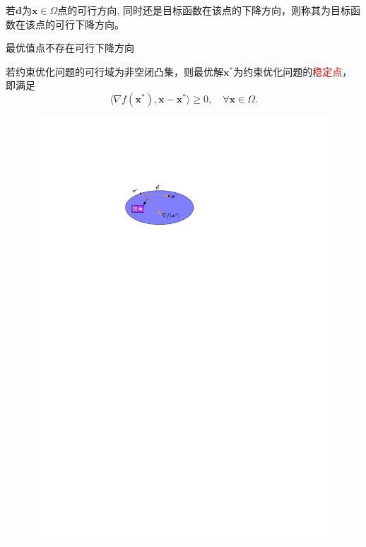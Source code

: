 \begin{theorem}[可行下降方向]
    若$\boldsymbol{d}$为$\boldsymbol{x}\in\Omega$点的可行方向, 同时还是目标函数在该点的下降方向，则称其为目标函数在该点的可行下降方向。

    最优值点不存在可行下降方向
\end{theorem}
\begin{theorem}
    若约束优化问题的可行域为非空闭凸集，则最优解$\boldsymbol{x}^*$为约束优化问题的\textcolor{red}{稳定点}，即满足
    \[
        \langle\nabla f(\boldsymbol{x}^{*}),{\boldsymbol{x}-\boldsymbol{x}^{*}}\rangle\geqslant0,\quad\forall\boldsymbol{x}\in\Omega.
    \]
    \begin{figure}[htbp]
        \centering
        \includegraphics{image/约束优化问题的稳定点.pdf}
    \end{figure}
\end{theorem}
